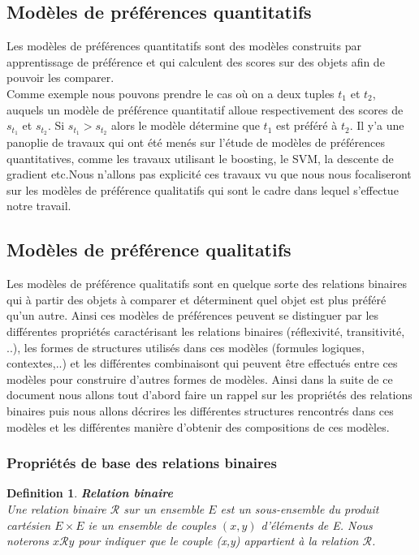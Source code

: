 \documentclass[a4paper,12pt,openany,oneside]{article}
\newtheorem{defn}{Definition} %
\begin{document}
\subsection{Modèles de préférences quantitatifs} 
Les modèles de préférences quantitatifs sont des modèles construits par apprentissage de préférence et qui calculent des scores sur des objets afin de pouvoir les comparer. \\
Comme exemple nous pouvons prendre le cas où on a deux tuples $t_1$ et $t_2$, auquels un modèle de préférence quantitatif alloue respectivement des scores de $s_{t_1}$ et $s_{t_2}$. Si $s_{t_1}>s_{t_2}$ alors le modèle détermine que $t_1$ est préféré à $t_2$.
Il y'a une panoplie de travaux qui ont été menés sur l'étude de modèles de préférences quantitatives, comme les travaux utilisant le boosting, le SVM, la descente de gradient etc.Nous n'allons pas explicité ces travaux vu que nous nous focaliseront sur les modèles de préférence qualitatifs qui sont le cadre dans lequel s'effectue notre travail.

\subsection{Modèles de préférence qualitatifs}
Les modèles de préférence qualitatifs sont en quelque sorte des relations binaires qui à partir des objets à comparer et déterminent quel objet est plus préféré qu'un autre. Ainsi ces modèles de préférences peuvent se distinguer par les différentes propriétés caractérisant les relations binaires (réflexivité, transitivité, ..), les formes de structures utilisés dans ces modèles (formules logiques, contextes,..) et les différentes combinaisont qui peuvent être effectués entre ces modèles pour construire d'autres formes de modèles. Ainsi dans la suite de ce document nous allons tout d'abord faire un rappel sur les propriétés des relations binaires puis nous allons décrires les différentes structures rencontrés dans ces modèles et les différentes manière d'obtenir des compositions de ces modèles.

\subsubsection{Propriétés de base des relations binaires}
\begin{defn}\textbf{Relation binaire}\\

Une relation binaire $\mathcal{R}$ sur un ensemble $E$ est un sous-ensemble du produit cartésien $E \times E$ ie un ensemble de couples $(x,y)$ d'éléments de E.
Nous noterons $x\mathcal{R}y$ pour indiquer que le couple (x,y) appartient à la relation $\mathcal{R}$.
\end{defn}
\end{document}
